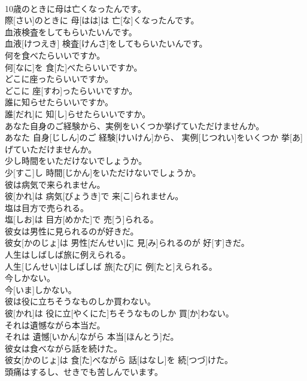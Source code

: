 \documentclass[8pt]{extreport}
\begin{document}
\begin{CJK}{UTF8}{min}
\\	10歳のときに母は亡くなったんです。	
\\	際[さい]のときに 母[はは]は 亡[な]くなったんです。	
\\	血液検査をしてもらいたいんです。	
\\	血液[けつえき] 検査[けんさ]をしてもらいたいんです。	
\\	何を食べたらいいですか。	
\\	何[なに]を 食[た]べたらいいですか。	
\\	どこに座ったらいいですか。	
\\	どこに 座[すわ]ったらいいですか。	
\\	誰に知らせたらいいですか。	
\\	誰[だれ]に 知[し]らせたらいいですか。	
\\	あなた自身のご経験から、実例をいくつか挙げていただけませんか。	
\\	あなた 自身[じしん]のご 経験[けいけん]から、 実例[じつれい]をいくつか 挙[あ]げていただけませんか。	
\\	少し時間をいただけないでしょうか。	
\\	少[すこ]し 時間[じかん]をいただけないでしょうか。	
\\	彼は病気で来られません。	
\\	彼[かれ]は 病気[びょうき]で 来[こ]られません。	
\\	塩は目方で売られる。	
\\	塩[しお]は 目方[めかた]で 売[う]られる。	
\\	彼女は男性に見られるのが好きだ。	
\\	彼女[かのじょ]は 男性[だんせい]に 見[み]られるのが 好[す]きだ。	
\\	人生はしばしば旅に例えられる。	
\\	人生[じんせい]はしばしば 旅[たび]に 例[たと]えられる。	
\\	今しかない。	
\\	今[いま]しかない。	
\\	彼は役に立ちそうなものしか買わない。	
\\	彼[かれ]は 役に立[やくにた]ちそうなものしか 買[か]わない。	
\\	それは遺憾ながら本当だ。	
\\	それは 遺憾[いかん]ながら 本当[ほんとう]だ。	
\\	彼女は食べながら話を続けた。	
\\	彼女[かのじょ]は 食[た]べながら 話[はなし]を 続[つづ]けた。	
\\	頭痛はするし、せきでも苦しんでいます。	

\end{CJK}
\end{document}
